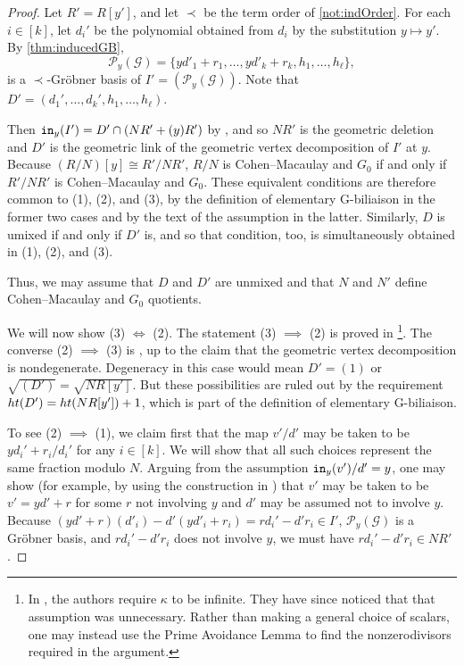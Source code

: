 \documentclass[12pt, reqno]{amsart}
\numberwithin{equation}{section}
\newtheorem{Main Conjecture}[theorem]{Main Conjecture}
\theoremstyle{definition}
\theoremstyle{plain}
\newcommand{\init}{{\tt in}}
\newcommand{\hgt}{{\rm{ht }}}
\newcommand{\G}{\mathcal{G}}
\renewcommand{\P}{\mathcal{P}}
\begin{document}
\begin{proof}
Let $R' = R[y']$, and let $\prec$ be the term order of \cref{not:indOrder}.  For each $i \in [k]$, let $d_i'$ be the polynomial obtained from $d_i$ by the substitution $y \mapsto y'$.  By \cref{thm:inducedGB},    
 \[
\P_y(\G) = \{yd'_1+r_1, \ldots, yd'_k+r_k, h_1, \ldots, h_\ell\},
\] is a $\prec$-Gr\"obner basis of $I' = (\P_y(\G))$.  Note that $D' = (d_1', \ldots, d_k', h_1, \ldots, h_\ell)$.

  Then $\init_y(I') = D' \cap (NR'+(y)R')$ by \cite[Theorem 2.1]{KMY09}, and so $NR'$ is the geometric deletion and $D'$ is the geometric link of the geometric vertex decomposition of $I'$ at $y$. Because $(R/N)[y] \cong R'/NR'$, $R/N$ is Cohen--Macaulay and $G_0$ if and only if $R'/NR'$ is Cohen--Macaulay and $G_0$.  These equivalent conditions are therefore common to (1), (2), and (3), by the definition of elementary G-biliaison in the former two cases and by the text of the assumption in the latter.  Similarly, $D$ is umixed if and only if $D'$ is, and so that condition, too, is simultaneously obtained in (1), (2), and (3).


Thus, we may assume that $D$ and $D'$ are unmixed and that $N$ and $N'$ define Cohen--Macaulay and $G_0$ quotients.  

We will now show (3) $\iff$ (2).  The statement (3) $\implies$ (2) is proved in \cite[Corollary 4.3]{KR21}\footnote{In \cite{KR21}, the authors require $\kappa$ to be infinite.  They have since noticed that that assumption was unnecessary.  Rather than making a general choice of scalars, one may instead use the Prime Avoidance Lemma to find the nonzerodivisors required in the argument.}.  The converse (2) $\implies$ (3) is \cite[Theorem 6.1]{KR21}, up to the claim that the geometric vertex decomposition is nondegenerate.  Degeneracy in this case would mean $D' = (1)$ or $\sqrt{(D')} = \sqrt{NR[y']}$.  But these possibilities are ruled out by the requirement $\hgt(D') = \hgt(NR[y'])+1$, which is part of the definition of elementary G-biliaison.

To see (2) $\implies$ (1), we claim first that the map $v'/d'$ may be taken to be $yd_i'+r_i/d_i'$ for any $i \in [k]$. We will show that all such choices represent the same fraction modulo $N$.  Arguing from the assumption $\init_y(v')/d' = y$, one may show (for example, by using the construction in \cite{KR21}) that $v'$ may be taken to be $v' = yd'+r$ for some $r$ not involving $y$ and $d'$ may be assumed not to involve $y$. Because $(yd'+r)(d'_i)-d'(yd'_i+r_i) = rd_i'-d'r_i  \in I'$, $\P_y(\G)$ is a Gr\"obner basis, and $rd_i'-d'r_i$ does not involve $y$, we must have $rd_i'-d'r_i \in NR'$. 


\end{proof}
\end{document}
